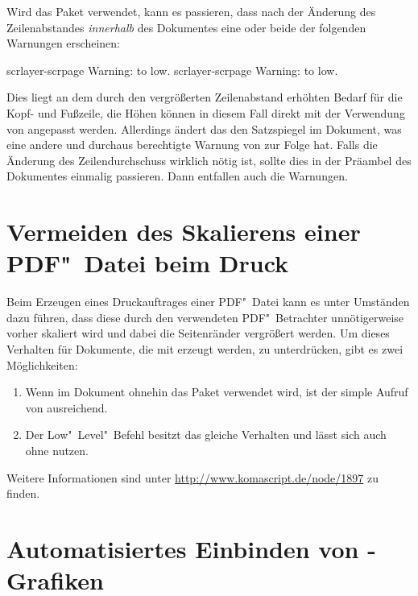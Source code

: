 Wird das Paket  verwendet, kann es passieren, dass nach der 
Änderung des Zeilenabstandes \emph{innerhalb} des Dokumentes eine oder beide 
der folgenden Warnungen erscheinen:
%
\begin{quoting}
\begin{Code}
scrlayer-scrpage Warning: \headheight to low.
scrlayer-scrpage Warning: \footheight to low.
\end{Code}
\end{quoting}
%
Dies liegt an dem durch den vergrößerten Zeilenabstand erhöhten Bedarf für die
Kopf- und Fußzeile, die Höhen können in diesem Fall direkt mit der Verwendung 
von  angepasst werden. Allerdings ändert das den 
Satzspiegel im Dokument, was eine andere und durchaus berechtigte Warnung von 
 zur Folge hat. Falls die Änderung des Zeilendurchschuss 
wirklich nötig ist, sollte dies in der Präambel des Dokumentes einmalig 
passieren. Dann entfallen auch die Warnungen.



\section{Vermeiden des Skalierens einer PDF"~Datei beim Druck}

%
Beim Erzeugen eines Druckauftrages einer PDF"~Datei kann es unter Umständen 
dazu führen, dass diese durch den verwendeten PDF"~Betrachter unnötigerweise 
vorher skaliert wird und dabei die Seitenränder vergrößert werden. Um dieses 
Verhalten für Dokumente, die mit  erzeugt werden, zu 
unterdrücken, gibt es zwei Möglichkeiten:
%
\begin{enumerate}
\item Wenn im Dokument ohnehin das Paket  verwendet wird, 
  ist der simple Aufruf von 
  ausreichend.
\item Der Low"~Level"~Befehl
  besitzt das gleiche Verhalten und lässt sich auch ohne  
  nutzen.
\end{enumerate}
%
Weitere Informationen sind unter \mbox{\url{http://www.komascript.de/node/1897}}
zu finden.



\section{%
  Automatisiertes Einbinden von -Grafiken%
}

